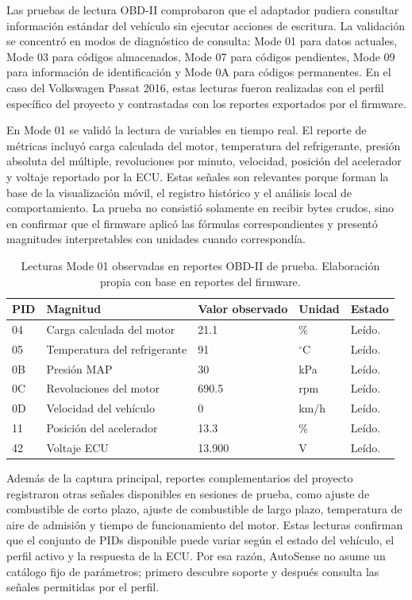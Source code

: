 \documentclass[12pt,letterpaper]{report}
\begin{document}
Las pruebas de lectura OBD-II comprobaron que el adaptador pudiera consultar información estándar del vehículo sin ejecutar acciones de escritura. La validación se concentró en modos de diagnóstico de consulta: Mode 01 para datos actuales, Mode 03 para códigos almacenados, Mode 07 para códigos pendientes, Mode 09 para información de identificación y Mode 0A para códigos permanentes. En el caso del Volkswagen Passat 2016, estas lecturas fueron realizadas con el perfil específico del proyecto y contrastadas con los reportes exportados por el firmware.

En Mode 01 se validó la lectura de variables en tiempo real. El reporte de métricas incluyó carga calculada del motor, temperatura del refrigerante, presión absoluta del múltiple, revoluciones por minuto, velocidad, posición del acelerador y voltaje reportado por la ECU. Estas señales son relevantes porque forman la base de la visualización móvil, el registro histórico y el análisis local de comportamiento. La prueba no consistió solamente en recibir bytes crudos, sino en confirmar que el firmware aplicó las fórmulas correspondientes y presentó magnitudes interpretables con unidades cuando correspondía.

\begin{table}[!htbp]
\centering
\scriptsize
\caption{Lecturas Mode 01 observadas en reportes OBD-II de prueba. Elaboración propia con base en reportes del firmware.}
\label{tab:obd-pid-tests}
\begin{tabular}{@{}p{}p{}p{}p{}p{}@{}}
\toprule
\textbf{PID} & \textbf{Magnitud} & \textbf{Valor observado} & \textbf{Unidad} & \textbf{Estado} \\
\midrule
04 & Carga calculada del motor & 21.1 & \% & Leído. \\
05 & Temperatura del refrigerante & 91 & $^\circ$C & Leído. \\
0B & Presión MAP & 30 & kPa & Leído. \\
0C & Revoluciones del motor & 690.5 & rpm & Leído. \\
0D & Velocidad del vehículo & 0 & km/h & Leído. \\
11 & Posición del acelerador & 13.3 & \% & Leído. \\
42 & Voltaje ECU & 13.900 & V & Leído. \\
\bottomrule
\end{tabular}
\end{table}

Además de la captura principal, reportes complementarios del proyecto registraron otras señales disponibles en sesiones de prueba, como ajuste de combustible de corto plazo, ajuste de combustible de largo plazo, temperatura de aire de admisión y tiempo de funcionamiento del motor. Estas lecturas confirman que el conjunto de PIDs disponible puede variar según el estado del vehículo, el perfil activo y la respuesta de la ECU. Por esa razón, AutoSense no asume un catálogo fijo de parámetros; primero descubre soporte y después consulta las señales permitidas por el perfil.
\end{document}
